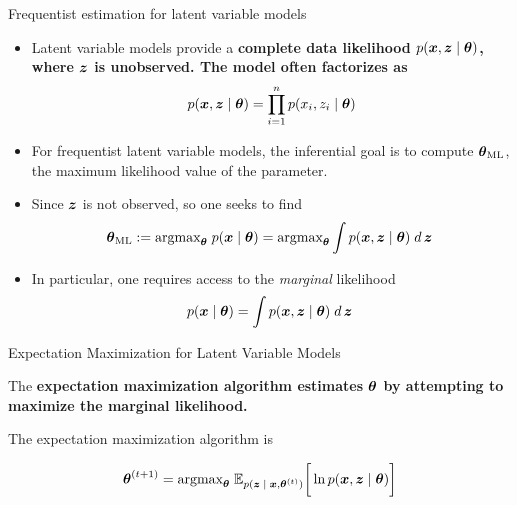 \documentclass[10pt]{beamer}
\begin{document}
\begin{frame}{Frequentist estimation for latent variable models}
\footnotesize
\begin{itemize}
\item Latent variable models provide a \bf{complete data likelihood}  $p ({\boldsymbol x}, {\boldsymbol z} \; | \; {\boldsymbol \theta})$, where ${\boldsymbol z}$ is unobserved. The model often factorizes as
\[   p ({\boldsymbol x},  {\boldsymbol z} \; | \; {\boldsymbol \theta}) = \displaystyle\prod_{i=1}^n  p (x_i, z_i \; | \; {\boldsymbol \theta}) \]
\item For frequentist latent variable models, the inferential goal is to compute ${\boldsymbol \theta}_{\text{ML}}$, the maximum likelihood value of the parameter.  
\item Since ${\boldsymbol z}$ is not observed, so one seeks to find 
\begin{equation}
{\boldsymbol \theta}_{\text{ML}}:=  \text{argmax}_{{\boldsymbol \theta}} \; p ({\boldsymbol x} \; | \; {\boldsymbol \theta}) = \text{argmax}_{{\boldsymbol \theta}} \displaystyle\int p({\boldsymbol x},{\boldsymbol z} \; | \; {\boldsymbol \theta}) \; d \,{{\boldsymbol z}} \; 
\label{ml_latent_vars}
\end{equation}
\item In particular, one requires access to the \textit{marginal} likelihood
\begin{equation}
p({\boldsymbol x} \; | \; {\boldsymbol \theta}) = \displaystyle\int p({\boldsymbol x},{\boldsymbol z} \; | \; {\boldsymbol \theta}) \; d \,{{\boldsymbol z}} \; 
\label{marginal_likelihood}
\end{equation}
\end{itemize}
\end{frame}






\begin{frame}{Expectation Maximization for Latent Variable Models}

The \bf{expectation maximization algorithm} estimates ${\boldsymbol \theta}$ by attempting to maximize the marginal likelihood. 

The expectation maximization algorithm is 

\begin{equation}
\label{eqn:em_algorithm_appendix}
 {\boldsymbol \theta}^{(t+1)} =  \text{argmax}_{{\boldsymbol \theta}} \; \mathbb{E}_{p({\boldsymbol z} \; | \; {\boldsymbol x} , {\boldsymbol \theta}^{(t)})} \bigg[ \ln p({\boldsymbol x}, {\boldsymbol z} \; | \; {\boldsymbol \theta}) \bigg] 
 \end{equation}
\end{frame}
\end{document}
